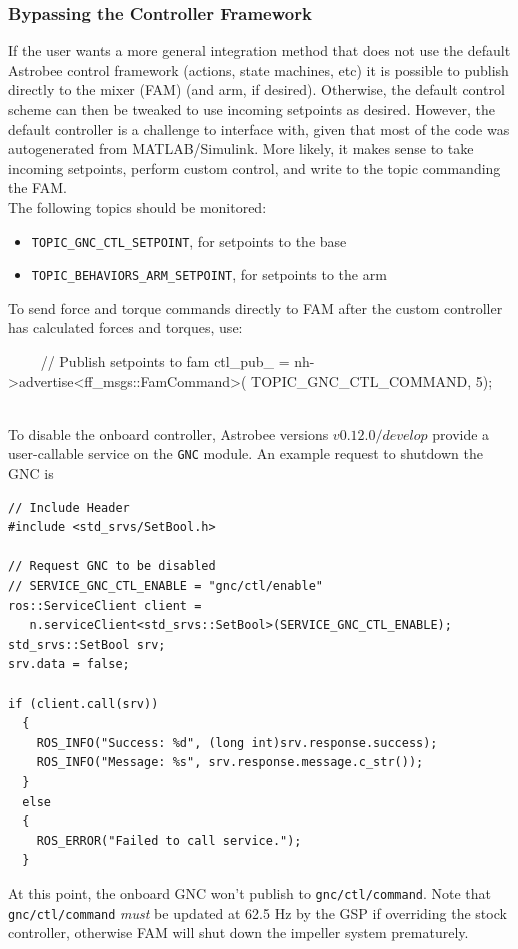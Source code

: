 \documentclass{article}
\begin{document}
\subsubsection{Bypassing the Controller Framework}

If the user wants a more general integration method that does not use the default Astrobee control framework (actions, state machines, etc) it is possible to publish directly to the mixer (FAM) (and arm, if desired). Otherwise, the default control scheme can then be tweaked to use incoming setpoints as desired. However, the default controller is a challenge to interface with, given that most of the code was autogenerated from MATLAB/Simulink. More likely, it makes sense to take incoming setpoints, perform custom control, and write to the topic commanding the FAM.\\

The following topics should be monitored:
\begin{itemize}
	\item \texttt{TOPIC\_GNC\_CTL\_SETPOINT}, for setpoints to the base
	\item \texttt{TOPIC\_BEHAVIORS\_ARM\_SETPOINT}, for setpoints to the arm
\end{itemize}

\indent To send force and torque commands directly to FAM after the custom controller has calculated forces and torques, use:
\begin{markdown}
~~~~
//  Publish setpoints to fam
ctl_pub_ = nh->advertise<ff_msgs::FamCommand>(
TOPIC_GNC_CTL_COMMAND, 5);
~~~~
\end{markdown}

To disable the onboard controller, Astrobee versions $v0.12.0/develop$ provide a user-callable service 
on the \texttt{GNC} module. An example request to shutdown the GNC is
\begin{lstlisting}
// Include Header 
#include <std_srvs/SetBool.h>

// Request GNC to be disabled
// SERVICE_GNC_CTL_ENABLE = "gnc/ctl/enable" 
ros::ServiceClient client = 
   n.serviceClient<std_srvs::SetBool>(SERVICE_GNC_CTL_ENABLE);
std_srvs::SetBool srv;
srv.data = false;

if (client.call(srv))
  {
    ROS_INFO("Success: %d", (long int)srv.response.success);
    ROS_INFO("Message: %s", srv.response.message.c_str());
  }
  else
  {
    ROS_ERROR("Failed to call service.");
  }
\end{lstlisting}
At this point, the onboard GNC won't publish to \texttt{gnc/ctl/command}. Note that \texttt{gnc/ctl/command} \textit{must} be updated at 62.5 Hz by the GSP if overriding the stock controller, otherwise FAM will shut down the impeller system prematurely. 
\end{document}
